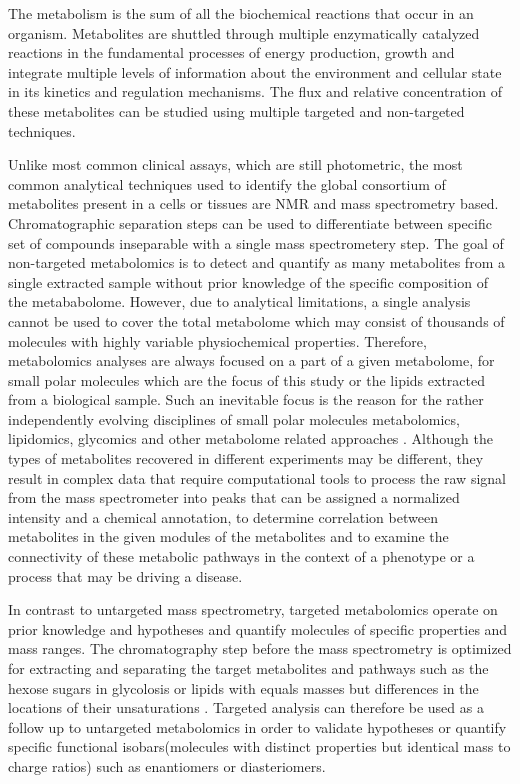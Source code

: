 \documentclass[a4paper]{book}
\begin{document}
	The metabolism is the sum of all the biochemical reactions that occur in an organism. Metabolites are shuttled through multiple enzymatically catalyzed reactions in the fundamental processes of energy production, growth and integrate multiple levels of information about the environment and cellular state in its kinetics and regulation mechanisms. The flux and relative concentration of these metabolites can be studied using multiple targeted and non-targeted techniques\citep{Aksenov2017GlobalSpectrometry}. 
	
	Unlike most common clinical assays, which are still photometric, the most common analytical techniques used to identify the global consortium of metabolites present in a cells or tissues are NMR and mass spectrometry based\citep{StanfordBloodTests}. Chromatographic separation steps can be used to differentiate between specific set of compounds inseparable with a single mass spectrometery step. The goal of non-targeted metabolomics is to detect and quantify as many metabolites from a single extracted sample without prior knowledge of the specific composition of the metababolome. However, due to analytical limitations, a single analysis cannot be used to cover the total metabolome which may consist of thousands of molecules with highly variable physiochemical properties. Therefore, metabolomics analyses are always focused on a part of a given metabolome, for small polar molecules which are the focus of this study or the lipids extracted from a biological sample\citep{Villas-BasSamplingPreparation}. Such an inevitable focus is the reason for the rather independently evolving disciplines of small polar molecules metabolomics, lipidomics, glycomics and other metabolome related approaches \citep{FGCZ2017MetabolomicsZurich}. Although the types of metabolites recovered in different experiments may be different, they result in complex data that require computational tools to process the raw signal from the mass spectrometer into peaks that can be assigned a normalized intensity and a chemical annotation, to determine correlation between metabolites in the given modules of the metabolites and to examine the connectivity of these metabolic pathways in the context of a phenotype or a process that may be driving a disease\citep{Aksenov2017GlobalSpectrometry}.
	
	In contrast to untargeted mass spectrometry, targeted metabolomics operate on prior knowledge and hypotheses and quantify molecules of specific properties and mass ranges. The chromatography step before the mass spectrometry is optimized for extracting and separating the target metabolites and pathways such as the hexose sugars in glycolosis or lipids with equals masses but differences in the locations of their unsaturations \citep{Cani2009}. Targeted analysis can therefore be used as a follow up to untargeted metabolomics in order to validate hypotheses or quantify specific functional isobars(molecules with distinct  properties but identical mass to charge ratios) such as enantiomers or diasteriomers.
	
\end{document}
